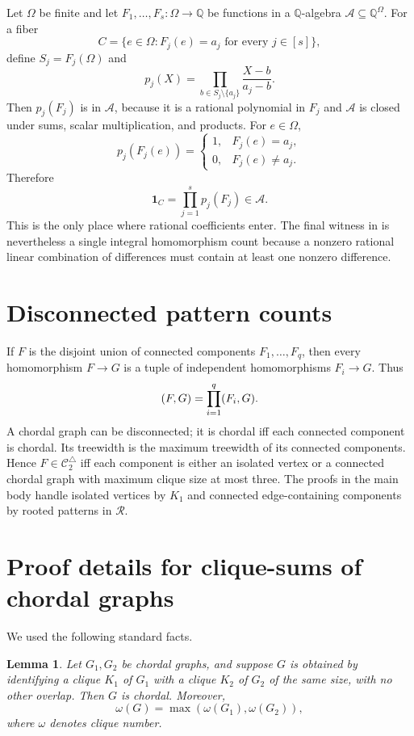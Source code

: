 \documentclass[11pt]{article}
\newtheorem{lemma}[theorem]{Lemma}
\let\hom\relax
\DeclareMathOperator{\hom}{hom}
\newcommand{\Q}{\mathbb{Q}}
\newcommand{\cC}{\mathcal{C}}
\newcommand{\cR}{\mathcal{R}}
\newcommand{\cA}{\mathcal{A}}
\begin{document}
Let $\Omega$ be finite and let $F_1,\ldots,F_s:\Omega\to\Q$ be functions in a $\Q$-algebra $\cA\subseteq\Q^\Omega$.  For a fiber
\[
C=\{e\in\Omega:F_j(e)=a_j\text{ for every }j\in[s]\},
\]
define $S_j=F_j(\Omega)$ and
\[
p_j(X)=\prod_{b\in S_j\setminus\{a_j\}}\frac{X-b}{a_j-b}.
\]
Then $p_j(F_j)$ is in $\cA$, because it is a rational polynomial in $F_j$ and $\cA$ is closed under sums, scalar multiplication, and products.  For $e\in\Omega$,
\[
p_j(F_j(e))=
\begin{cases}
1,&F_j(e)=a_j,\\
0,&F_j(e)\neq a_j.
\end{cases}
\]
Therefore
\[
\mathbf{1}_C=\prod_{j=1}^s p_j(F_j)\in\cA.
\]
This is the only place where rational coefficients enter.  The final witness in  is nevertheless a single integral homomorphism count because a nonzero rational linear combination of differences must contain at least one nonzero difference.

\section{Disconnected pattern counts}
\label{app:disconnected}

If $F$ is the disjoint union of connected components $F_1,\ldots,F_q$, then every homomorphism $F\to G$ is a tuple of independent homomorphisms $F_i\to G$.  Thus
\[
\hom(F,G)=\prod_{i=1}^q\hom(F_i,G).
\]
A chordal graph can be disconnected; it is chordal iff each connected component is chordal.  Its treewidth is the maximum treewidth of its connected components.  Hence $F\in\cC_2^\triangle$ iff each component is either an isolated vertex or a connected chordal graph with maximum clique size at most three.  The proofs in the main body handle isolated vertices by $K_1$ and connected edge-containing components by rooted patterns in $\cR$.

\section{Proof details for clique-sums of chordal graphs}
\label{app:clique-sums}

We used the following standard facts.

\begin{lemma}
Let $G_1,G_2$ be chordal graphs, and suppose $G$ is obtained by identifying a clique $K_1$ of $G_1$ with a clique $K_2$ of $G_2$ of the same size, with no other overlap.  Then $G$ is chordal.  Moreover,
\[
\omega(G)=\max(\omega(G_1),\omega(G_2)),
\]
where $\omega$ denotes clique number.
\end{lemma}
\end{document}
